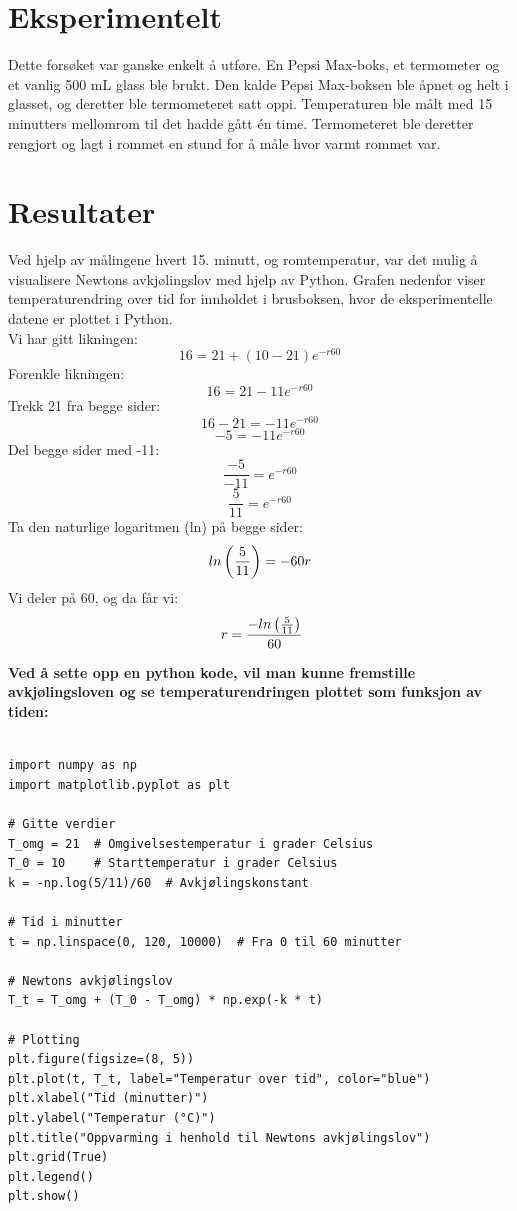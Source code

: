 \documentclass[a4paper,12pt]{article}
\begin{document}
\section{Eksperimentelt}
Dette forsøket var ganske enkelt å utføre. En Pepsi Max-boks, et termometer og et vanlig 500 mL glass ble brukt. Den kalde Pepsi Max-boksen ble åpnet og helt i glasset, og deretter ble termometeret satt oppi. Temperaturen ble målt med 15 minutters mellomrom til det hadde gått én time. Termometeret ble deretter rengjort og lagt i rommet en stund for å måle hvor varmt rommet var.

\section{Resultater}
Ved hjelp av målingene hvert 15. minutt, og romtemperatur, var det mulig å visualisere Newtons avkjølingslov med hjelp av Python. 
Grafen nedenfor viser temperaturendring over tid for innholdet i brusboksen, hvor de eksperimentelle datene er plottet i Python.
\\
Vi har gitt likningen:
\[16 = 21 + (10 - 21) e^{-r60}\]
Forenkle likningen:
\[16 = 21 - 11 e^{-r60}\]
Trekk 21 fra begge sider:
\[16 - 21 = -11 e^{-r60}\]
\[-5 = -11 e^{-r60}\]
Del begge sider med -11:
\[\frac{-5}{-11} = e^{-r60}\]
\[\frac{5}{11} = e^{-r60}\]
Ta den naturlige logaritmen (ln) på begge sider:
\[\-ln\left(\frac{5}{11}\right) = -60r\]
Vi deler på 60, og da får vi:
\[\ r = \frac{\--ln\left(\frac{5}{11}\right)}{60} \]

\newpage
\noindent\textbf{Ved å sette opp en python kode, vil man kunne fremstille avkjølingsloven og se temperaturendringen plottet som funksjon av tiden:} 

\begin{verbatim}

import numpy as np
import matplotlib.pyplot as plt

# Gitte verdier
T_omg = 21  # Omgivelsestemperatur i grader Celsius
T_0 = 10    # Starttemperatur i grader Celsius
k = -np.log(5/11)/60  # Avkjølingskonstant

# Tid i minutter
t = np.linspace(0, 120, 10000)  # Fra 0 til 60 minutter

# Newtons avkjølingslov
T_t = T_omg + (T_0 - T_omg) * np.exp(-k * t)

# Plotting
plt.figure(figsize=(8, 5))
plt.plot(t, T_t, label="Temperatur over tid", color="blue")
plt.xlabel("Tid (minutter)")
plt.ylabel("Temperatur (°C)")
plt.title("Oppvarming i henhold til Newtons avkjølingslov")
plt.grid(True)
plt.legend()
plt.show()
\end{verbatim}
\newpage
\end{document}

